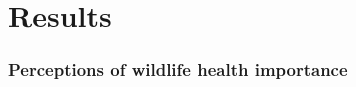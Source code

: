 \documentclass[
  letterpaper,
  DIV=11,
  numbers=noendperiod]{scrartcl}
\author{}
\date{}
\begin{document}
\ifdefined\Shaded\renewenvironment{Shaded}{\begin{tcolorbox}[breakable, interior hidden, enhanced, borderline west={3pt}{0pt}{shadecolor}, frame hidden, sharp corners, boxrule=0pt]}{\end{tcolorbox}}\fi

\hypertarget{results}{%
\section{Results}\label{results}}

\hypertarget{perceptions-of-wildlife-health-importance}{%
\subsubsection{Perceptions of wildlife health
importance}\label{perceptions-of-wildlife-health-importance}}
\end{document}
